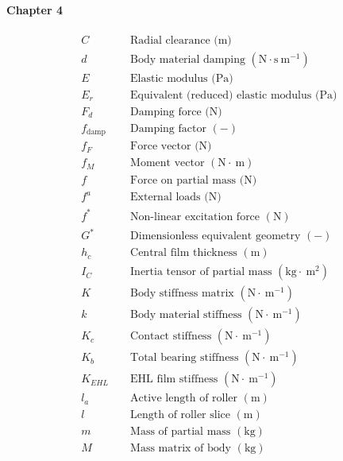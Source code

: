 \paragraph{Chapter 4}
\begin{align*}
	&C && \text { Radial clearance (m) } \\
	&d && \text { Body material damping }\left(\mathrm{N} \cdot \mathrm{s} \mathrm{~m}^{-1}\right) \\
	&E && \text { Elastic modulus (Pa) } \\
	&E_r && \text { Equivalent (reduced) elastic modulus (Pa) } \\
	&F_d && \text { Damping force (N) } \\
	&f_{\text {damp }} && \text { Damping factor }(-) \\
	&f_F && \text { Force vector (N) } \\
	&f_M && \text { Moment vector }(\mathrm{N} \cdot \mathrm{~m}) \\
	&f && \text { Force on partial mass (N) } \\
	&f^a && \text { External loads (N) } \\
	&f^* && \text { Non-linear excitation force }(\mathrm{N}) \\
	&G^* && \text { Dimensionless equivalent geometry }(-) \\
	&h_c && \text { Central film thickness }(\mathrm{m}) \\
	&I_C && \text { Inertia tensor of partial mass }\left(\mathrm{kg} \cdot \mathrm{~m}^2\right) \\
	&K && \text { Body stiffness matrix }\left(\mathrm{N} \cdot \mathrm{~m}^{-1}\right) \\
	&k && \text { Body material stiffness }\left(\mathrm{N} \cdot \mathrm{~m}^{-1}\right) \\
	&K_c && \text { Contact stiffness }\left(\mathrm{N} \cdot \mathrm{~m}^{-1}\right) \\
	&K_b && \text { Total bearing stiffness }\left(\mathrm{N} \cdot \mathrm{~m}^{-1}\right) \\
	&K_{E H L} && \text { EHL film stiffness }\left(\mathrm{N} \cdot \mathrm{~m}^{-1}\right) \\
	&l_a && \text { Active length of roller }(\mathrm{m}) \\
	&l && \text { Length of roller slice }(\mathrm{m}) \\
	&m && \text { Mass of partial mass }(\mathrm{kg}) \\
	&M && \text { Mass matrix of body }(\mathrm{kg}) \\

\end{align*}
